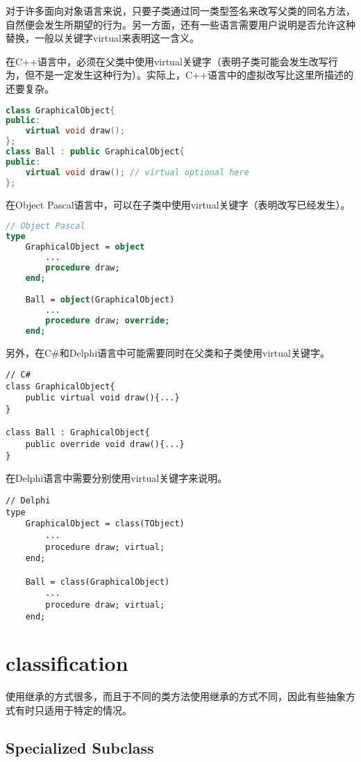 对于许多面向对象语言来说，只要子类通过同一类型签名来改写父类的同名方法，自然便会发生所期望的行为。另一方面，还有一些语言需要用户说明是否允许这种替换，一般以关键字virtual来表明这一含义。

在C++语言中，必须在父类中使用virtual关键字（表明子类可能会发生改写行为，但不是一定发生这种行为）。实际上，C++语言中的虚拟改写比这里所描述的还要复杂。

\begin{lstlisting}[language=C++]
class GraphicalObject{
public:
	virtual void draw();
};
class Ball : public GraphicalObject{
public:
	virtual void draw(); // virtual optional here	
};
\end{lstlisting}

在Object Pascal语言中，可以在子类中使用virtual关键字（表明改写已经发生）。


\begin{lstlisting}[language=Pascal]
// Object Pascal
type
	GraphicalObject = object
		...
		procedure draw;
	end;

	Ball = object(GraphicalObject)
		...
		procedure draw; override;
	end;
\end{lstlisting}

另外，在C\#和Delphi语言中可能需要同时在父类和子类使用virtual关键字。



\begin{lstlisting}[language={[Sharp]C}]
// C#
class GraphicalObject{
	public virtual void draw(){...}
}

class Ball : GraphicalObject{
	public override void draw(){...}
}
\end{lstlisting}

在Delphi语言中需要分别使用virtual关键字来说明。



\begin{lstlisting}[language=Delphi]
// Delphi
type
	GraphicalObject = class(TObject)
		...
		procedure draw; virtual;
	end;

	Ball = class(GraphicalObject)
		...
		procedure draw; virtual;
	end;
\end{lstlisting}


\chapter{classification}

使用继承的方式很多，而且于不同的类方法使用继承的方式不同，因此有些抽象方式有时只适用于特定的情况。


\section{Specialized Subclass}



